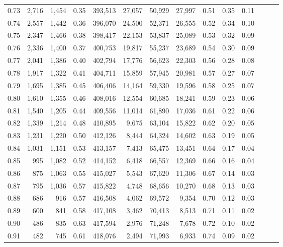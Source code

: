 \begin{tabular}{rrrrrrrrrrrrrr}
0.73 &  2,716 &  1,454 &  0.35 &  393,513 &   27,057 &  50,929 &  27,997 &  0.51 &  0.35 &      0.11 \\
0.74 &  2,557 &  1,442 &  0.36 &  396,070 &   24,500 &  52,371 &  26,555 &  0.52 &  0.34 &      0.10 \\
0.75 &  2,347 &  1,466 &  0.38 &  398,417 &   22,153 &  53,837 &  25,089 &  0.53 &  0.32 &      0.09 \\
0.76 &  2,336 &  1,400 &  0.37 &  400,753 &   19,817 &  55,237 &  23,689 &  0.54 &  0.30 &      0.09 \\
0.77 &  2,041 &  1,386 &  0.40 &  402,794 &   17,776 &  56,623 &  22,303 &  0.56 &  0.28 &      0.08 \\
0.78 &  1,917 &  1,322 &  0.41 &  404,711 &   15,859 &  57,945 &  20,981 &  0.57 &  0.27 &      0.07 \\
0.79 &  1,695 &  1,385 &  0.45 &  406,406 &   14,164 &  59,330 &  19,596 &  0.58 &  0.25 &      0.07 \\
0.80 &  1,610 &  1,355 &  0.46 &  408,016 &   12,554 &  60,685 &  18,241 &  0.59 &  0.23 &      0.06 \\
0.81 &  1,540 &  1,205 &  0.44 &  409,556 &   11,014 &  61,890 &  17,036 &  0.61 &  0.22 &      0.06 \\
0.82 &  1,339 &  1,214 &  0.48 &  410,895 &    9,675 &  63,104 &  15,822 &  0.62 &  0.20 &      0.05 \\
0.83 &  1,231 &  1,220 &  0.50 &  412,126 &    8,444 &  64,324 &  14,602 &  0.63 &  0.19 &      0.05 \\
0.84 &  1,031 &  1,151 &  0.53 &  413,157 &    7,413 &  65,475 &  13,451 &  0.64 &  0.17 &      0.04 \\
0.85 &    995 &  1,082 &  0.52 &  414,152 &    6,418 &  66,557 &  12,369 &  0.66 &  0.16 &      0.04 \\
0.86 &    875 &  1,063 &  0.55 &  415,027 &    5,543 &  67,620 &  11,306 &  0.67 &  0.14 &      0.03 \\
0.87 &    795 &  1,036 &  0.57 &  415,822 &    4,748 &  68,656 &  10,270 &  0.68 &  0.13 &      0.03 \\
0.88 &    686 &    916 &  0.57 &  416,508 &    4,062 &  69,572 &   9,354 &  0.70 &  0.12 &      0.03 \\
0.89 &    600 &    841 &  0.58 &  417,108 &    3,462 &  70,413 &   8,513 &  0.71 &  0.11 &      0.02 \\
0.90 &    486 &    835 &  0.63 &  417,594 &    2,976 &  71,248 &   7,678 &  0.72 &  0.10 &      0.02 \\
0.91 &    482 &    745 &  0.61 &  418,076 &    2,494 &  71,993 &   6,933 &  0.74 &  0.09 &      0.02 \\

\end{tabular}
